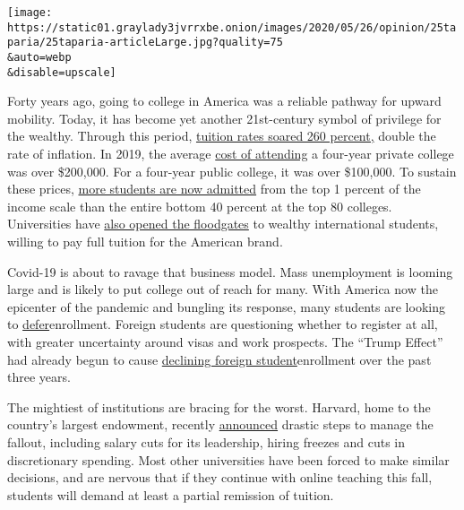 \texttt{[image: https://static01.graylady3jvrrxbe.onion/images/2020/05/26/opinion/25taparia/25taparia-articleLarge.jpg?quality=75\\\&auto=webp\\\&disable=upscale]}

Forty years ago, going to college in America was a reliable pathway for
upward mobility. Today, it has become yet another 21st-century symbol of
privilege for the wealthy. Through this period,
\href{https://nces.ed.gov/programs/digest/d13/tables/dt13_330.10.asp}{tuition
rates soared 260 percent,} double the rate of inflation. In 2019, the
average
\href{https://www.collegedata.com/en/pay-your-way/college-sticker-shock/how-much-does-college-cost/whats-the-price-tag-for-a-college-education/}{cost
of attending} a four-year private college was over \$200,000. For a
four-year public college, it was over \$100,000. To sustain these
prices,
\href{http://www.equality-of-opportunity.org/assets/documents/coll_mrc_paper.pdf}{more
students are now admitted} from the top 1 percent of the income scale
than the entire bottom 40 percent at the top 80 colleges. Universities
have \href{http://graphics.wsj.com/international-students/}{also opened
the floodgates} to wealthy international students, willing to pay full
tuition for the American brand.

Covid-19 is about to ravage that business model. Mass unemployment is
looming large and is likely to put college out of reach for many. With
America now the epicenter of the pandemic and bungling its response,
many students are looking to
\href{https://www.nytimes3xbfgragh.onion/2020/05/01/us/coronavirus-college-enrollment.html}{defer}enrollment.
Foreign students are questioning whether to register at all, with
greater uncertainty around visas and work prospects. The ``Trump
Effect'' had already begun to cause
\href{https://www.insidehighered.com/admissions/article/2019/11/18/international-enrollments-declined-undergraduate-graduate-and}{declining
foreign student}enrollment over the past three years.

The mightiest of institutions are bracing for the worst. Harvard, home
to the country's largest endowment, recently
\href{https://www.harvard.edu/president/news/2020/economic-impact-covid-19}{announced}
drastic steps to manage the fallout, including salary cuts for its
leadership, hiring freezes and cuts in discretionary spending. Most
other universities have been forced to make similar decisions, and are
nervous that if they continue with online teaching this fall, students
will demand at least a partial remission of tuition.

